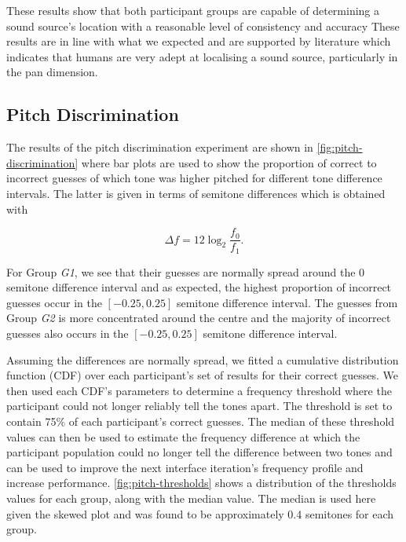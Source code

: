 \documentclass{article}
\begin{document}
These results show that both participant groups are capable of determining a sound source's location with a reasonable level of consistency and accuracy
These results are in line with what we expected and are supported by literature which indicates that humans are very adept at localising a sound source, particularly in the pan dimension. 

\subsection{Pitch Discrimination}

The results of the pitch discrimination experiment are shown in \cref{fig:pitch-discrimination} where bar plots are used to show the proportion of correct to incorrect guesses of which tone was higher pitched for different tone difference intervals. 
The latter is given in terms of semitone differences which is obtained with 

\begin{equation}
\label{eq:semitone-difference}
  \Delta f = 12\log_2\frac{f_0}{f_1}.
\end{equation}

For Group \textit{G1}, we see that their guesses are normally spread around the 0 semitone difference interval and as expected, the highest proportion of incorrect guesses occur in the $[-0.25, 0.25]$ semitone difference interval. 
The guesses from Group \textit{G2} is more concentrated around the centre and the majority of incorrect guesses also occurs in the $[-0.25, 0.25]$ semitone difference interval.

Assuming the differences are normally spread, we fitted a cumulative distribution function (CDF) over each participant's set of results for their correct guesses.
We then used each CDF's parameters to determine a frequency threshold where the participant could not longer reliably tell the tones apart. 
The threshold is set to contain 75\% of each participant's correct guesses.%
The median of these threshold values can then be used to estimate the frequency difference at which the participant population could no longer tell the difference between two tones and can be used to improve the next interface iteration's frequency profile and increase performance. 
\cref{fig:pitch-thresholds} shows a distribution of the thresholds values for each group, along with the median value. 
The median is used here given the skewed plot and was found to be approximately 0.4 semitones for each group.
\end{document}
